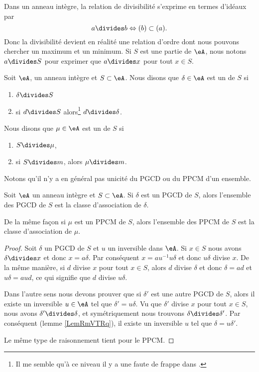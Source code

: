 Dans un anneau intègre, la relation de divisibilité s'exprime en termes d'idéaux par
\begin{equation}
    a\divides b\Leftrightarrow (b)\subset (a).
\end{equation}
Donc la divisibilité devient en réalité une relation d'ordre dont nous pouvons chercher un maximum et un minimum. Si \( S\) est une partie de \( \eA\), nous notons \( a\divides S\) pour exprimer que \( a\divides x\) pour tout \( x\in S\).

\begin{definition}\label{DefrYwbct}
    Soit \( \eA\), un anneau intègre et \( S\subset \eA\). Nous disons que \( \delta\in \eA\) est un  de \( S\) si
    \begin{enumerate}
        \item
            \( \delta\divides S\)
        \item
            si \( d\divides S\) alors\footnote{Il me semble qu'à ce niveau il y a une faute de frappe dans \cite{XPXxPl}.} \( d\divides \delta\).
    \end{enumerate}
    Nous disons que \( \mu\in \eA\) est un  de \( S\) si
    \begin{enumerate}
        \item
            \( S\divides \mu\),
        \item
            si \( S\divides m\), alors \( \mu\divides m\).
    \end{enumerate}
\end{definition}
Notons qu'il n'y a en général pas unicité du PGCD ou du PPCM d'un ensemble.

\begin{lemma}
    Soit \( \eA\) un anneau intègre et \( S\subset \eA\). Si \( \delta\) est un PGCD de \( S\), alors l'ensemble des PGCD de \( S\) est la classe d'association de \( \delta\).

    De la même façon si \( \mu\) est un PPCM de \( S\), alors l'ensemble des PPCM de \( S\) est la classe d'association de \( \mu\).
\end{lemma}

\begin{proof}
    Soit \( \delta\) un PGCD de \( S\) et \( u\) un inversible dans \( \eA\). Si \( x\in S\) nous avons \( \delta\divides x\) et donc \( x=a\delta\). Par conséquent \( x=au^{-1}u\delta\) et donc \( u\delta\) divise \( x\). De la même manière, si \( d\) divise \( x\) pour tout \( x\in S\), alors \( d\) divise \( \delta\) et donc \( \delta=ad\) et \( u\delta=aud\), ce qui signifie que \( d\) divise \( u\delta\).

    Dans l'autre sens nous devons prouver que si \( \delta'\) est une autre PGCD de \( S\), alors il existe un inversible \( u\in \eA\) tel que \( \delta'=u\delta\). Vu que \( \delta'\) divise \( x\) pour tout \( x\in S\), nous avons \( \delta'\divides \delta\), et symétriquement nous trouvons \( \delta\divides\delta'\). Par conséquent (lemme \ref{LemRmVTRq}), il existe un inversible \( u\) tel que \( \delta=u\delta'\).

    Le même type de raisonnement tient pour le PPCM.
\end{proof}

